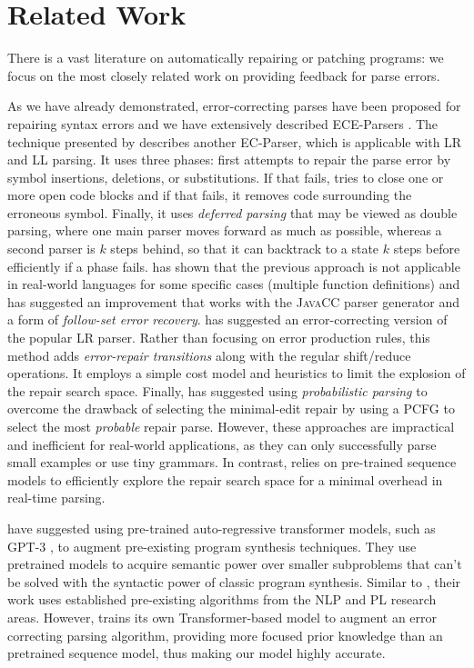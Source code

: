 \section{Related Work}
\label{sec:related-work}

There is a vast literature on automatically repairing or patching programs:
we focus on the most closely related work on providing feedback for parse
errors.

%
As we have already demonstrated, error-correcting parses have been proposed for
repairing syntax errors and we have extensively described ECE-Parsers
\citep{Aho_1972}. The technique presented by \citep{Burke1987} describes another
EC-Parser, which is applicable with LR and LL parsing. It uses three phases:
first attempts to repair the parse error by symbol insertions, deletions, or
substitutions. If that fails, tries to close one or more open code blocks and if
that fails, it removes code surrounding the erroneous symbol. Finally, it uses
\emph{deferred parsing} that may be viewed as double parsing, where one main
parser moves forward as much as possible, whereas a second parser is $k$ steps
behind, so that it can backtrack to a state $k$ steps before efficiently if a
phase fails. \citep{VanDerSpek_2005} has shown that the previous approach is not
applicable in real-world languages for some specific cases (\eg multiple
function definitions) and has suggested an improvement that works with the
\textsc{JavaCC} parser generator and a form of \emph{follow-set error recovery}.
\citep{Corchuelo2002} has suggested an error-correcting version of the popular
LR parser. Rather than focusing on error production rules, this method adds
\emph{error-repair transitions} along with the regular shift/reduce operations.
It employs a simple cost model and heuristics to limit the explosion of the
repair search space. Finally, \citep{Thompson1976} has suggested using
\emph{probabilistic parsing} to overcome the drawback of selecting the
minimal-edit repair by using a PCFG to select the most \emph{probable} repair
parse. However, these approaches are impractical and inefficient for real-world
applications, as they can only successfully parse small examples or use tiny
grammars. In contrast, \toolname relies on pre-trained sequence models to
efficiently explore the repair search space for a minimal overhead in real-time
parsing.

%
\citep{Rahmani2021, Verbruggen2021} have suggested using pre-trained
auto-regressive transformer models, such as \textsc{GPT-3} \citep{GPT2020}, to
augment pre-existing program synthesis techniques. They use pretrained models to
acquire semantic power over smaller subproblems that can't be solved with the
syntactic power of classic program synthesis. Similar to \toolname, their work
uses established pre-existing algorithms from the NLP and PL research areas.
However, \toolname trains its own Transformer-based model to augment an error
correcting parsing algorithm, providing more focused prior knowledge than an
pretrained sequence model, thus making our model highly accurate.

